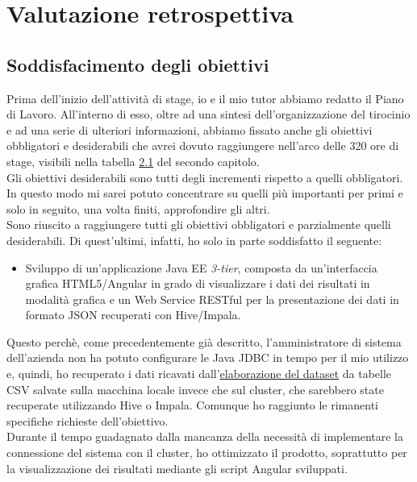 
\chapter{Valutazione retrospettiva}
\label{cap:valutazione-retrospettiva}

\section{Soddisfacimento degli obiettivi}
Prima dell'inizio dell'attività di stage, io e il mio tutor abbiamo redatto il Piano di Lavoro. All'interno di esso, oltre ad una sintesi dell'organizzazione del tirocinio e ad una serie di ulteriori informazioni, abbiamo fissato anche gli obiettivi obbligatori e desiderabili che avrei dovuto raggiungere nell'arco delle 320 ore di stage, visibili nella tabella \hyperref[obiettivi_stage]{2.1} del secondo capitolo.\\
Gli obiettivi desiderabili sono tutti degli incrementi rispetto a quelli obbligatori. In questo modo mi sarei potuto concentrare su quelli più importanti per primi e solo in seguito, una volta finiti, approfondire gli altri.\\ 
Sono riuscito a raggiungere tutti gli obiettivi obbligatori e parzialmente quelli desiderabili. Di quest'ultimi, infatti, ho solo in parte soddisfatto il seguente:
\begin{itemize}
	\item Sviluppo di un'applicazione Java EE \textit{3-tier}, composta da un'interfaccia grafica HTML5/Angular in grado di visualizzare i dati dei risultati in modalità grafica e un Web Service RESTful per la presentazione dei dati in formato JSON recuperati con Hive/Impala.
\end{itemize}
Questo perchè, come precedentemente già descritto, l'amministratore di sistema dell'azienda non ha potuto configurare le \gls{Java JDBC} in tempo per il mio utilizzo e, quindi, ho recuperato i dati ricavati dall'\hyperref[dataset]{elaborazione del dataset} da tabelle \gls{CSV} salvate sulla macchina locale invece che sul \gls{cluster}, che sarebbero state recuperate utilizzando Hive o Impala. Comunque ho raggiunto le rimanenti specifiche richieste dell'obiettivo. \\
Durante il tempo guadagnato dalla mancanza della necessità di implementare la connessione del sistema con il \gls{cluster}, ho ottimizzato il prodotto, soprattutto per la visualizzazione dei risultati mediante gli script Angular sviluppati. \\\\
